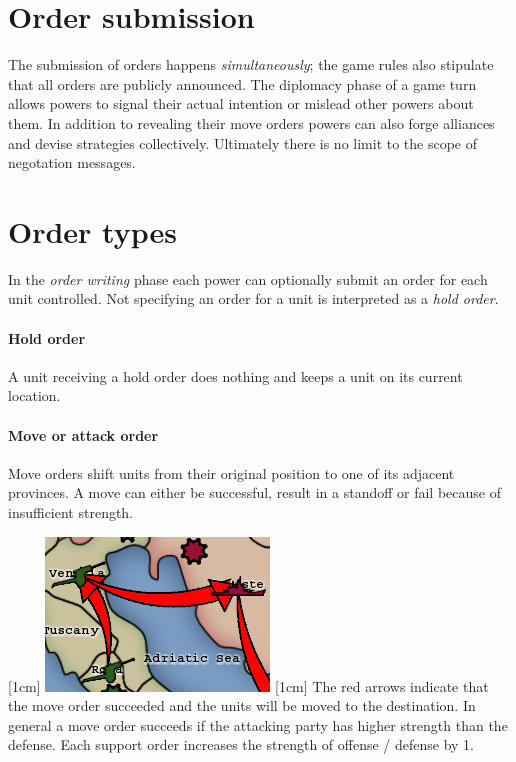 \documentclass[pdftex,12pt,a4paper]{report}
\begin{document}
\section{Order submission}

The submission of orders happens \textit{simultaneously}; the game
rules also stipulate that all orders are publicly announced. The diplomacy
phase of a game turn allows powers to signal their actual intention or
mislead other powers about them. In addition to revealing their move
orders powers can also forge alliances and devise strategies
collectively. Ultimately there is no limit to the scope of negotation
messages.

\section{Order types}

In the \textit{order writing} phase each power can optionally submit
an order for each unit controlled. Not specifying an order for a 
unit is interpreted as a \textit{hold order}. 

\paragraph{Hold order}
A unit receiving a hold order does nothing and keeps a unit on its 
current location. 

\paragraph{Move or attack order} 
Move orders shift units from their original position to one of its
adjacent provinces. A move can either be successful, result in a
standoff or fail because of insufficient strength. 

[1cm]
\includegraphics{./screenshots/Move0.png} %
[1cm]
The red arrows indicate that the move order succeeded and the units
will be moved to the destination. In general a move order succeeds
if the attacking party has higher strength than the defense. Each 
support order increases the strength of offense / defense by 1.
\end{document}
